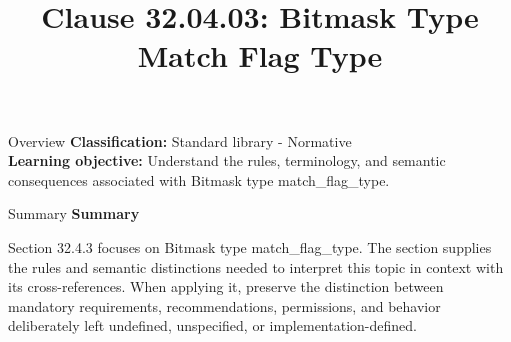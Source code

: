 \documentclass[10pt,letterpaper]{article}
\title{Clause 32.04.03: Bitmask Type Match Flag Type}
\author{}
\date{}
\begin{document}
\maketitle
\begin{CornellOverviewBox}{Overview}
\textbf{Classification:} Standard library - Normative\\[2pt]
\textbf{Learning objective:} Understand the rules, terminology, and semantic consequences associated with Bitmask type match\_flag\_type.
\end{CornellOverviewBox}\begin{CornellSummaryBox}{Summary}
{\sffamily\bfseries\color{Accent} Summary}\par\vspace{3pt}Section 32.4.3 focuses on Bitmask type match\_flag\_type. The section supplies the rules and semantic distinctions needed to interpret this topic in context with its cross-references. When applying it, preserve the distinction between mandatory requirements, recommendations, permissions, and behavior deliberately left undefined, unspecified, or implementation-defined.
\end{CornellSummaryBox}
\end{document}

